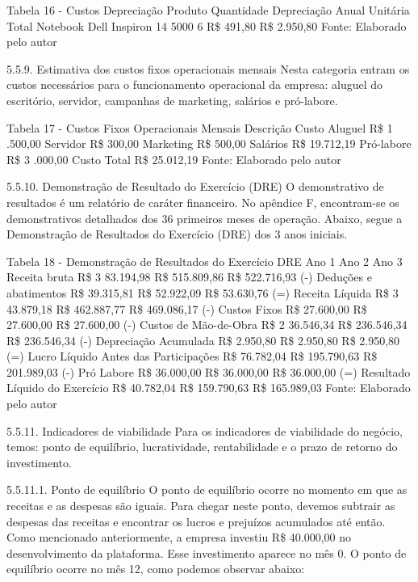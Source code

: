 Tabela 16 - Custos Depreciação 
Produto	Quantidade	Depreciação Anual
Unitária	Total
Notebook Dell Inspiron 14 5000	6	R\$  491,80	R\$  2.950,80
Fonte: Elaborado pelo autor 

5.5.9. Estimativa dos custos fixos operacionais mensais 
Nesta categoria entram os custos necessários para o funcionamento operacional da empresa: aluguel do escritório, servidor, campanhas de marketing, salários e pró-labore. 

Tabela 17 - Custos Fixos Operacionais Mensais 
Descrição	Custo
Aluguel	R\$    1 .500,00
Servidor	R\$        300,00
Marketing	R\$        500,00
Salários	R\$  19.712,19
Pró-labore	R\$    3 .000,00
Custo Total	R\$  25.012,19
Fonte: Elaborado pelo autor 

5.5.10. 	Demonstração de Resultado do Exercício (DRE) 
O demonstrativo de resultados é um relatório de caráter financeiro. No apêndice F, encontram-se os demonstrativos detalhados dos 36 primeiros meses de operação. Abaixo, segue a Demonstração de Resultados do Exercício (DRE) dos 3 anos iniciais. 

Tabela 18 - Demonstração de Resultados do Exercício 
DRE	Ano 1	Ano 2	Ano 3
Receita bruta	R\$  3 83.194,98	R\$   515.809,86	R\$   522.716,93
(-) Deduções e abatimentos	R\$     39.315,81	R\$     52.922,09	R\$     53.630,76
(=) Receita Líquida	R\$  3 43.879,18	R\$   462.887,77	R\$   469.086,17
(-) Custos Fixos	R\$     27.600,00	R\$     27.600,00	R\$     27.600,00
(-) Custos de Mão-de-Obra	R\$  2 36.546,34	R\$   236.546,34	R\$   236.546,34
(-) Depreciação Acumulada	R\$       2.950,80	R\$       2.950,80	R\$       2.950,80
(=) Lucro Líquido Antes das 
Participações	R\$     76.782,04	R\$   195.790,63	R\$   201.989,03
(-) Pró Labore	R\$     36.000,00	R\$     36.000,00	R\$     36.000,00
(=) Resultado Líquido do 
Exercício	R\$     40.782,04	R\$   159.790,63	R\$   165.989,03
Fonte: Elaborado pelo autor 

5.5.11. 	Indicadores de viabilidade 
Para os indicadores de viabilidade do negócio, temos: ponto de equilíbrio, lucratividade, rentabilidade e o prazo de retorno do investimento. 

5.5.11.1. 	Ponto de equilíbrio 
O ponto de equilíbrio ocorre no momento em que as receitas e as despesas são iguais. Para chegar neste ponto, devemos subtrair as despesas das receitas e encontrar os lucros e prejuízos acumulados até então. Como mencionado anteriormente, a empresa investiu R\$ 40.000,00 no desenvolvimento da plataforma. Esse investimento aparece no mês 0. O ponto de equilíbrio ocorre no mês 12, como podemos observar abaixo: 




